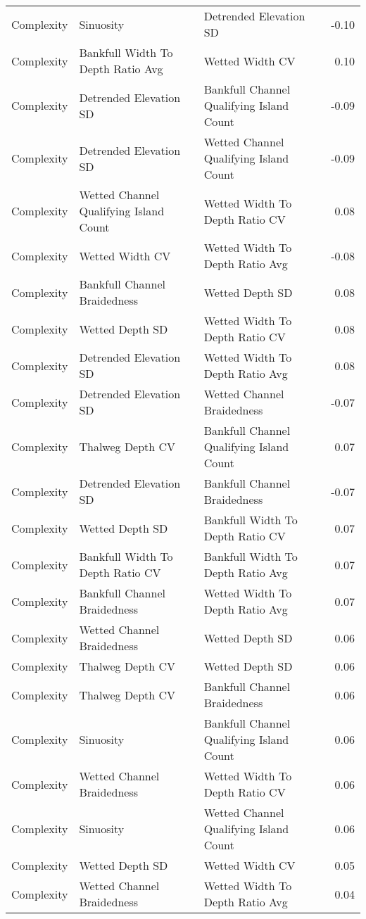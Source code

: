\documentclass[
  12pt,
]{article}
\begin{document}
\begin{longtable}[t]{>{\raggedright\arraybackslash}p{1in}>{\raggedright\arraybackslash}p{2in}>{\raggedright\arraybackslash}p{2in}r}
Complexity & Sinuosity & Detrended Elevation SD & -0.10\\
Complexity & Bankfull Width To Depth Ratio Avg & Wetted Width CV & 0.10\\
Complexity & Detrended Elevation SD & Bankfull Channel Qualifying Island Count & -0.09\\
\addlinespace
Complexity & Detrended Elevation SD & Wetted Channel Qualifying Island Count & -0.09\\
Complexity & Wetted Channel Qualifying Island Count & Wetted Width To Depth Ratio CV & 0.08\\
Complexity & Wetted Width CV & Wetted Width To Depth Ratio Avg & -0.08\\
Complexity & Bankfull Channel Braidedness & Wetted Depth SD & 0.08\\
Complexity & Wetted Depth SD & Wetted Width To Depth Ratio CV & 0.08\\
\addlinespace
Complexity & Detrended Elevation SD & Wetted Width To Depth Ratio Avg & 0.08\\
Complexity & Detrended Elevation SD & Wetted Channel Braidedness & -0.07\\
Complexity & Thalweg Depth CV & Bankfull Channel Qualifying Island Count & 0.07\\
Complexity & Detrended Elevation SD & Bankfull Channel Braidedness & -0.07\\
Complexity & Wetted Depth SD & Bankfull Width To Depth Ratio CV & 0.07\\
\addlinespace
Complexity & Bankfull Width To Depth Ratio CV & Bankfull Width To Depth Ratio Avg & 0.07\\
Complexity & Bankfull Channel Braidedness & Wetted Width To Depth Ratio Avg & 0.07\\
Complexity & Wetted Channel Braidedness & Wetted Depth SD & 0.06\\
Complexity & Thalweg Depth CV & Wetted Depth SD & 0.06\\
Complexity & Thalweg Depth CV & Bankfull Channel Braidedness & 0.06\\
\addlinespace
Complexity & Sinuosity & Bankfull Channel Qualifying Island Count & 0.06\\
Complexity & Wetted Channel Braidedness & Wetted Width To Depth Ratio CV & 0.06\\
Complexity & Sinuosity & Wetted Channel Qualifying Island Count & 0.06\\
Complexity & Wetted Depth SD & Wetted Width CV & 0.05\\
Complexity & Wetted Channel Braidedness & Wetted Width To Depth Ratio Avg & 0.04\\

\end{longtable}
\end{document}
